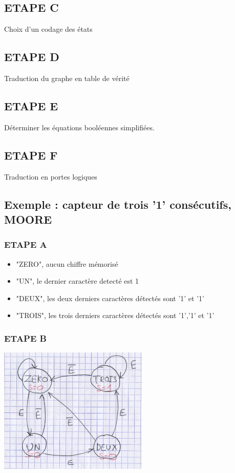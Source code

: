 \documentclass[10pt]{article}
\begin{document}
\subsection{ETAPE C}
Choix d'un codage des états

\subsection{ETAPE D}
Traduction du graphe en table de vérité

\subsection{ETAPE E}
Déterminer les équations booléennes simplifiées.

\subsection{ETAPE F}
Traduction en portes logiques

\subsection{Exemple : capteur de trois '1' consécutifs, MOORE}

\subsubsection{ETAPE A}
\begin{itemize}
  \item "ZERO", aucun chiffre mémorisé
  \item "UN", le dernier caractère detecté est 1
  \item "DEUX", les deux derniers caractères détectés sont '1' et '1'
  \item "TROIS", les trois derniers caractères détectés sont '1','1' et '1'
\end{itemize}

\subsubsection{ETAPE B}
  \begin{center}
    \includegraphics[height=6cm]{./pics/graph2.png}
  \end{center}
\end{document}
